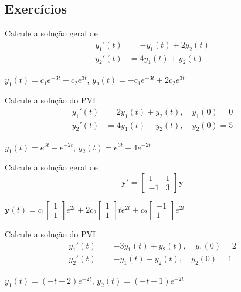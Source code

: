\subsection*{Exercícios}

\begin{exer}
  Calcule a solução geral de
  \begin{align}
    y_1'(t) &= -y_1(t) + 2y_2(t) \\
    y_2'(t) &= 4y_1(t) + y_2(t)
  \end{align}
\end{exer}
\begin{resp}
  $y_1(t) = c_1e^{-3t} + c_2e^{3t}$, $y_2(t) = -c_1e^{-3t} + 2c_2e^{3t}$
\end{resp}

\begin{exer}
  Calcule a solução do PVI
  \begin{align}
    y_1'(t) &= 2y_1(t) + y_2(t),\quad y_1(0) = 0 \\
    y_2'(t) &= 4y_1(t) - y_2(t),\quad y_2(0) = 5
  \end{align}
\end{exer}
\begin{resp}
  $y_1(t) = e^{3t} - e^{-2t}$, $y_2(t) = e^{3t} + 4e^{-2t}$
\end{resp}

\begin{exer}
  Calcule a solução geral de
  \begin{equation}
    \pmb{y}' =
    \begin{bmatrix}
      1 & 1 \\
      -1 & 3
    \end{bmatrix}\pmb{y}
  \end{equation}
\end{exer}
\begin{resp}
  $\displaystyle \pmb{y}(t) = c_1
  \begin{bmatrix}
    1\\
    1
  \end{bmatrix}e^{2t} + 2c_2
  \begin{bmatrix}
    1\\
    1
  \end{bmatrix}te^{2t} + c_2
  \begin{bmatrix}
    -1\\
    1
  \end{bmatrix}e^{2t}$
\end{resp}

\begin{exer}
  Calcule a solução do PVI
  \begin{align}
    y_1'(t) &= -3y_1(t) + y_2(t),\quad y_1(0) = 2 \\
    y_2'(t) &= -y_1(t) - y_2(t),\quad y_2(0) = 1
  \end{align}
\end{exer}
\begin{resp}
  $y_1(t) = (-t+2)e^{-2t}$, $y_2(t) = (-t+1)e^{-2t}$
\end{resp}


